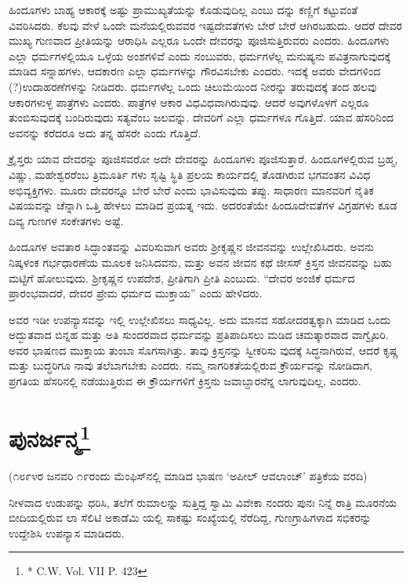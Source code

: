 ಹಿಂದೂಗಳು ಬಾಹ್ಯ ಆಕಾರಕ್ಕೆ ಅಷ್ಟು ಪ್ರಾಮುಖ್ಯತೆಯನ್ನು ಕೊಡುವುದಿಲ್ಲ ಎಂಬು ದನ್ನು ಕಣ್ಣಿಗೆ ಕಟ್ಟುವಂತೆ ವಿವರಿಸಿದರು. ಕೆಲವು ವೇಳೆ ಒಂದೇ ಮನೆಯಲ್ಲಿರುವವರ ಇಷ್ಟದೇವತೆಗಳು ಬೇರೆ ಬೇರೆ ಆಗಿರಬಹುದು. ಆದರೆ ದೇವರ ಮುಖ್ಯ ಗುಣವಾದ ಪ್ರೀತಿಯನ್ನು ಆರಾಧಿಸಿ ಎಲ್ಲರೂ ಒಂದೇ ದೇವರನ್ನು ಪೂಜಿಸುತ್ತಿರುವರು ಎಂದರು. ಹಿಂದೂಗಳು ಎಲ್ಲಾ ಧರ್ಮಗಳಲ್ಲಿಯೂ ಒಳ್ಳೆಯ ಅಂಶಗಳಿವೆ ಎಂದು ನಂಬುವರು, ಧರ್ಮಗಳೆಲ್ಲ ಮನುಷ್ಯನು ಪವಿತ್ರನಾಗುವುದಕ್ಕೆ ಮಾಡಿದ ಸನ್ನಾಹಗಳು, ಆದಕಾರಣ ಎಲ್ಲಾ ಧರ್ಮಗಳನ್ನು ಗೌರವಿಸಬೇಕು ಎಂದರು. ಇದಕ್ಕೆ ಅವರು ವೇದಗಳಿಂದ (?)ಉದಾಹರಣೆಗಳನ್ನು ನೀಡಿದರು. ಧರ್ಮಗಳೆಲ್ಲ ಒಂದು ಚಿಲುಮೆಯಿಂದ ನೀರನ್ನು ತರುವುದಕ್ಕೆ ತಂದ ಹಲವು ಆಕಾರಗಳುಳ್ಳ ಪಾತ್ರೆಗಳು ಎಂದರು. ಪಾತ್ರೆಗಳ ಆಕಾರ ವಿಧವಿಧವಾಗಿರುವುವು. ಆದರೆ ಅವುಗಳೊಳಗೆ ಎಲ್ಲರೂ ತುಂಬಿಸುವುದಕ್ಕೆ ಬಂದಿರುವುದು ಸತ್ಯವೆಂಬ ಜಲವನ್ನು. ದೇವರಿಗೆ ಎಲ್ಲಾ ಧರ್ಮಗಳೂ ಗೊತ್ತಿದೆ. ಯಾವ ಹೆಸರಿನಿಂದ ಅವನನ್ನು ಕರೆದರೂ ಅದು ತನ್ನ ಹೆಸರೇ ಎಂದು ಗೊತ್ತಿದೆ.

ಕ್ರೈಸ್ತರು ಯಾವ ದೇವರನ್ನು ಪೂಜಿಸವರೋ ಅದೇ ದೇವರನ್ನು ಹಿಂದೂಗಳು ಪೂಜಿಸುತ್ತಾರೆ. ಹಿಂದೂಗಳಲ್ಲಿರುವ ಬ್ರಹ್ಮ, ವಿಷ್ಣು, ಮಹೇಶ್ವರರೆಂಬ ತ್ರಿಮೂರ್ತಿ ಗಳು ಸೃಷ್ಟಿ ಸ್ಥಿತಿ ಪ್ರಲಯ ಕಾರ್ಯದಲ್ಲಿ ತೊಡಗಿರುವ ಭಗವಂತನ ವಿವಿಧ ಅಭಿವ್ಯಕ್ತಿಗಳು. ಮೂರು ದೇವರನ್ನೂ ಬೇರೆ ಬೇರೆ ಎಂದು ಭಾವಿಸುವುದು ತಪ್ಪು. ಸಾಧಾರಣ ಮಾನವರಿಗೆ ನೈತಿಕ ವಿಷಯವನ್ನು ಚೆನ್ನಾಗಿ ಒತ್ತಿ ಹೇಳಲು ಮಾಡಿದ ಪ್ರಯತ್ನ ಇದು. ಅದರಂತೆಯೇ ಹಿಂದೂದೇವತೆಗಳ ವಿಗ್ರಹಗಳು ಕೂಡ ದಿವ್ಯ ಗುಣಗಳ ಸಂಕೇತಗಳು ಅಷ್ಟೆ.

ಹಿಂದೂಗಳ ಅವತಾರ ಸಿದ್ಧಾಂತವನ್ನು ವಿವರಿಸುವಾಗ ಅವರು ಶ‍್ರೀಕೃಷ್ಣನ ಜೀವನವನ್ನು ಉಲ್ಲೇಖಿಸಿದರು. ಅವನು ನಿಷ್ಕಳಂಕ ಗರ್ಭಧಾರಣೆಯ ಮೂಲಕ ಜನಿಸಿದವನು, ಮತ್ತು ಅವನ ಜೀವನ ಕಥೆ ಜೀಸಸ್​ ಕ್ರಿಸ್ತನ ಜೀವನವನ್ನು ಬಹು ಮಟ್ಟಿಗೆ ಹೋಲುವುದು. ಶ‍್ರೀಕೃಷ್ಣನ ಉಪದೇಶ, ಪ್ರೀತಿಗಾಗಿ ಪ್ರೀತಿ ಎಂಬುದು. “ದೇವರ ಅಂಜಿಕೆ ಧರ್ಮದ ಪ್ರಾರಂಭವಾದರೆ, ದೇವರ ಪ್ರೇಮ ಧರ್ಮದ ಮುಕ್ತಾಯ” ಎಂದು ಹೇಳಿದರು.

ಅವರ ಇಡೀ ಉಪನ್ಯಾಸವನ್ನು ಇಲ್ಲಿ ಉಲ್ಲೇಖಿಸಲು ಸಾಧ್ಯವಿಲ್ಲ. ಅದು ಮಾನವ ಸಹೋದರತ್ವಕ್ಕಾಗಿ ಮಾಡಿದ ಒಂದು ಅದ್ಭುತವಾದ ಬಿನ್ನಹ ಮತ್ತು ಅತಿ ಸುಂದರವಾದ ಧರ್ಮವನ್ನು ಪ್ರತಿಪಾದಿಸಲು ಮಡಿದ ಚಮತ್ಕಾರವಾದ ವಾಗ್ವೈಖರಿ. ಅವರ ಭಾಷಣದ ಮುಕ್ತಾಯ ತುಂಬಾ ಸೊಗಸಾಗಿತ್ತು. ತಾವು ಕ್ರಿಸ್ತನನ್ನು ಸ್ವೀಕರಿಸು ವುದಕ್ಕೆ ಸಿದ್ಧನಾಗಿರುವೆ, ಆದರೆ ಕೃಷ್ಣ ಮತ್ತು ಬುದ್ಧರಿಗೂ ನಾವು ತಲೆಬಾಗಬೇಕು ಎಂದರು. ನಮ್ಮ ನಾಗರಿಕತೆಯಲ್ಲಿರುವ ಕ್ರೌರ್ಯವನ್ನು ನೋಡಿದಾಗ, ಪ್ರಗತಿಯ ಹೆಸರಿನಲ್ಲಿ ನಡೆಯುತ್ತಿರುವ ಈ ಕ್ರೌರ್ಯಗಳಿಗೆ ಕ್ರಿಸ್ತನು ಜವಾಬ್ದಾರನೆನ್ನ ಲಾಗುವುದಿಲ್ಲ, ಎಂದರು.


\section[ಪುನರ್ಜನ್ಮ]{ಪುನರ್ಜನ್ಮ\protect\footnote{* C.W. Vol. VII P. 423}}

\begin{center}
(೧೮೯೪ರ ಜನವರಿ ೧೯ರಂದು ಮೆಂಫಿಸ್​ನಲ್ಲಿ ಮಾಡಿದ ಭಾಷಣ ‘ಅಪೀಲ್​ ಆವಲಾಂಚ್​’ ಪತ್ರಿಕೆಯ ವರದಿ)
\end{center}

ನೀಳವಾದ ಉಡುಪನ್ನು ಧರಿಸಿ, ತಲೆಗೆ ರುಮಾಲನ್ನು ಸುತ್ತಿದ್ದ ಸ್ವಾಮಿ ವಿವೇಕಾ ನಂದರು ಪುನಃ ನಿನ್ನೆ ರಾತ್ರಿ ಮೂರನೆಯ ಬೀದಿಯಲ್ಲಿರುವ ಲಾ ಸೆಲಿಟಿ ಅಕಾಡೆಮಿ ಯಲ್ಲಿ ಸಾಕಷ್ಟು ಸಂಖ್ಯೆಯಲ್ಲಿ ನೆರೆದಿದ್ದ, ಗುಣಗ್ರಾಹಿಗಳಾದ ಸಭಿಕರನ್ನು ಉದ್ದೇಶಿಸಿ ಉಪನ್ಯಾಸ ಮಾಡಿದರು.

